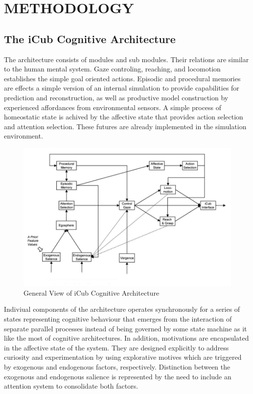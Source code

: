 \documentclass[a4paper, 12pt]{report}
\begin{document}
\chapter{METHODOLOGY}
\section{The iCub Cognitive Architecture}
The architecture consists of modules and sub modules. Their relations are 
similar to the human mental system. Gaze controling, reaching, and locomotion 
establishes the simple goal oriented actions. Episodic and procedural memories 
are effects a simple version of an internal simulation to provide capabilities 
for prediction and reconstruction, as well as productive model construction 
by experienced affordances from environmental sensors. A simple process of 
homeostatic state is achived by the affective state that provides action 
selection and attention selection. These futures are already implemented in the 
simulation environment.
\begin{figure}[h!]
  \centering
  \includegraphics[width=1.0\linewidth]{cognitive_architecture}
  \caption{General View of iCub Cognitive Architecture}
  \label{fig:cognitive_architecture}
 \end{figure}
Indiviual components of the architecture operates synchronously for a series of 
states representing cognitive behaviour that emerges from the interaction of 
separate parallel processes instead of being governed by some state machine as 
it like the most of cognitive architectures. In addition, motivations are 
encapsulated in the affective state of the system. They are designed explicitly 
to address curiosity and experimentation by using explorative motives which are 
triggered by exogenous and endogenous factors, respectively. Distinction 
between the exogenous and endogenous salience is represented by the need to 
include an attention system to consolidate both factors.
\newpage
\end{document}
